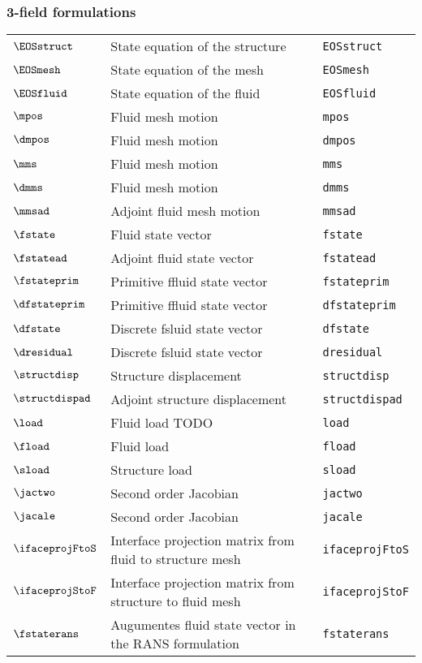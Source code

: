 \subsubsection*{3-field formulations}
\begin{tabular}{l l l}
$\EOSstruct$ & State equation of the structure& \texttt{EOSstruct}\\
$\EOSmesh$ & State equation of the mesh& \texttt{EOSmesh}\\
$\EOSfluid$ & State equation of the fluid& \texttt{EOSfluid}\\
$\mpos$ & Fluid mesh motion& \texttt{mpos}\\
$\dmpos$ & Fluid mesh motion& \texttt{dmpos}\\
$\mms$ & Fluid mesh motion& \texttt{mms}\\
$\dmms$ & Fluid mesh motion& \texttt{dmms}\\
$\mmsad$ & Adjoint fluid mesh motion& \texttt{mmsad}\\
$\fstate$ & Fluid state vector& \texttt{fstate}\\
$\fstatead$ & Adjoint fluid state vector& \texttt{fstatead}\\
$\fstateprim$ & Primitive ffluid state vector& \texttt{fstateprim}\\
$\dfstateprim$ & Primitive ffluid state vector& \texttt{dfstateprim}\\
$\dfstate$ & Discrete fsluid state vector& \texttt{dfstate}\\
$\dresidual$ & Discrete fsluid state vector& \texttt{dresidual}\\
$\structdisp$ & Structure displacement& \texttt{structdisp}\\
$\structdispad$ & Adjoint structure displacement& \texttt{structdispad}\\
$\load$ & Fluid load TODO& \texttt{load}\\
$\fload$ & Fluid load& \texttt{fload}\\
$\sload$ & Structure load& \texttt{sload}\\
$\jactwo$ & Second order Jacobian& \texttt{jactwo}\\
$\jacale$ & Second order Jacobian& \texttt{jacale}\\
$\ifaceprojFtoS$ & Interface projection matrix from fluid to structure mesh& \texttt{ifaceprojFtoS}\\
$\ifaceprojStoF$ & Interface projection matrix from structure to fluid mesh& \texttt{ifaceprojStoF}\\
$\fstaterans$ & Augumentes fluid state vector in the \ac{RANS} formulation& \texttt{fstaterans}\\

\end{tabular}
